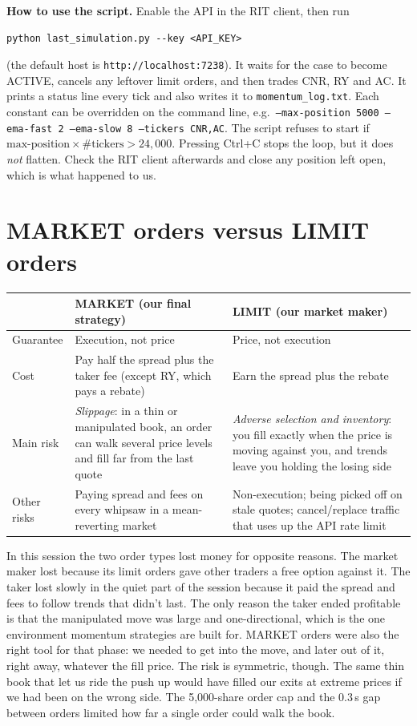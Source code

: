 \documentclass[11pt]{article}
\begin{document}
\textbf{How to use the script.} Enable the API in the RIT client, then run
\begin{verbatim}
python last_simulation.py --key <API_KEY>
\end{verbatim}
(the default host is \texttt{http://localhost:7238}). It waits for the case to
become ACTIVE, cancels any leftover limit orders, and then trades CNR, RY and AC.
It prints a status line every tick and also writes it to
\texttt{momentum\_log.txt}. Each constant can be overridden on the command line,
e.g.\ \texttt{--max-position 5000 --ema-fast 2 --ema-slow 8 --tickers CNR,AC}. The
script refuses to start if $\text{max-position}\times\#\text{tickers} > 24{,}000$.
Pressing Ctrl+C stops the loop, but it does \emph{not} flatten. Check the RIT
client afterwards and close any position left open, which is what happened to us.

\section{MARKET orders versus LIMIT orders}

\begin{table}[H]
\centering
\small
\begin{tabular}{@{}p{2.4cm}p{6.1cm}p{6.1cm}@{}}
\toprule
 & \textbf{MARKET (our final strategy)} & \textbf{LIMIT (our market maker)} \\
\midrule
Guarantee & Execution, not price & Price, not execution \\
Cost & Pay half the spread plus the taker fee (except RY, which pays a rebate) & Earn the spread plus the rebate \\
Main risk & \emph{Slippage}: in a thin or manipulated book, an order can walk
            several price levels and fill far from the last quote &
            \emph{Adverse selection and inventory}: you fill exactly when the price
            is moving against you, and trends leave you holding the losing side \\
Other risks & Paying spread and fees on every whipsaw in a mean-reverting market &
              Non-execution; being picked off on stale quotes; cancel/replace
              traffic that uses up the API rate limit \\
\bottomrule
\end{tabular}
\end{table}

In this session the two order types lost money for opposite reasons. The market
maker lost because its limit orders gave other traders a free option against it.
The taker lost slowly in the quiet part of the session because it paid the spread
and fees to follow trends that didn't last. The only reason the taker ended
profitable is that the manipulated move was large and one-directional, which is
the one environment momentum strategies are built for. MARKET orders were also the
right tool for that phase: we needed to get into the move, and later out of it,
right away, whatever the fill price. The risk is symmetric, though. The same thin
book that let us ride the push up would have filled our exits at extreme prices if
we had been on the wrong side. The 5,000-share order cap and the 0.3\,s gap between
orders limited how far a single order could walk the book.
\end{document}
